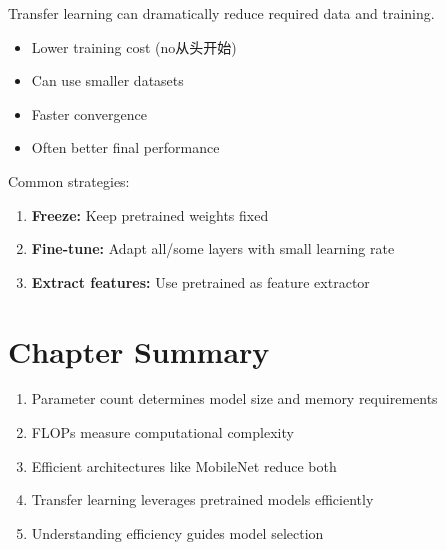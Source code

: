 Transfer learning can dramatically reduce required data and training.

\begin{properties}
\begin{itemize}
    \item Lower training cost (no从头开始)
    \item Can use smaller datasets
    \item Faster convergence
    \item Often better final performance
\end{itemize}
\end{properties}

Common strategies:
\begin{enumerate}
    \item \textbf{Freeze:} Keep pretrained weights fixed
    \item \textbf{Fine-tune:} Adapt all/some layers with small learning rate
    \item \textbf{Extract features:} Use pretrained as feature extractor
\end{enumerate}

\section{Chapter Summary}

\begin{enumerate}
    \item Parameter count determines model size and memory requirements
    \item FLOPs measure computational complexity
    \item Efficient architectures like MobileNet reduce both
    \item Transfer learning leverages pretrained models efficiently
    \item Understanding efficiency guides model selection
\end{enumerate}
